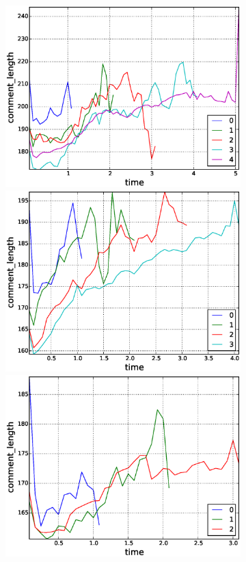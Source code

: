 \begin{figure}[!tb]
\begin{subfigure}{1\textwidth}\includegraphics[scale=0.285]{./images/avr_comment_length_for_surviving_year_for_2010.eps}
\includegraphics[scale=0.285]{./images/avr_comment_length_for_surviving_year_for_2011.eps}
\includegraphics[scale=0.285]{./images/avr_comment_length_for_surviving_year_for_2012.eps}

\end{subfigure}
\end{figure}
